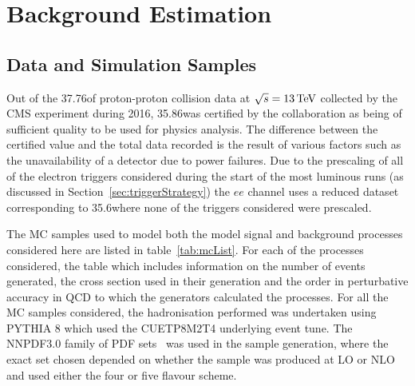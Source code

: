 \chapter{Background Estimation}\label{chapter:bkg}
%
%
%
%

\section{Data and Simulation Samples}\label{sec:samples}
Out of the 37.76\fbinv of  proton-proton collision data at $\sqrt{s} = 13\,\text{Te\hspace{-.08em}V}$ collected by the CMS experiment during 2016, 35.86\fbinv was certified by the collaboration as being of sufficient quality to be used for physics analysis.
The difference between the certified value and the total data recorded is the result of various factors such as the unavailability of a detector due to power failures.
Due to the prescaling of all of the electron triggers considered during the start of the most luminous runs (as discussed in Section~\ref{sec:triggerStrategy}) the $ee$ channel uses a reduced dataset corresponding to 35.6\fbinv where none of the triggers considered were prescaled.

The MC samples used to model both the model signal and background processes considered here are listed in table~\ref{tab:mcList}.
For each of the processes considered, the table which includes information on the number of events generated, the cross section used in their generation and the order in perturbative accuracy in QCD to which the generators calculated the processes.
For all the MC samples considered, the hadronisation performed was undertaken using PYTHIA 8 which used the CUETP8M2T4 underlying event tune.
The NNPDF3.0 family of PDF sets~\cite{Ball:2012cx} was used in the sample generation, where the exact set chosen depended on whether the sample was produced at LO or NLO and used either the four or five flavour scheme.

